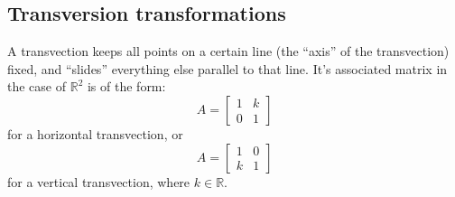 \subsection{Transversion transformations}
\begin{definition}
    A transvection keeps all points on a certain line (the “axis” of the transvection) fixed, and “slides” everything else parallel to that line. It's associated matrix in the case of $\mathbb{R}^2$ is of the form:
    \[
        A = \begin{bmatrix}
            1 & k \\
            0 & 1
        \end{bmatrix}
    \]
    for a horizontal transvection, or
    \[
        A = \begin{bmatrix}
            1 & 0 \\
            k & 1
        \end{bmatrix}
    \]
    for a vertical transvection, where $k \in \mathbb{R}$.
\end{definition}
